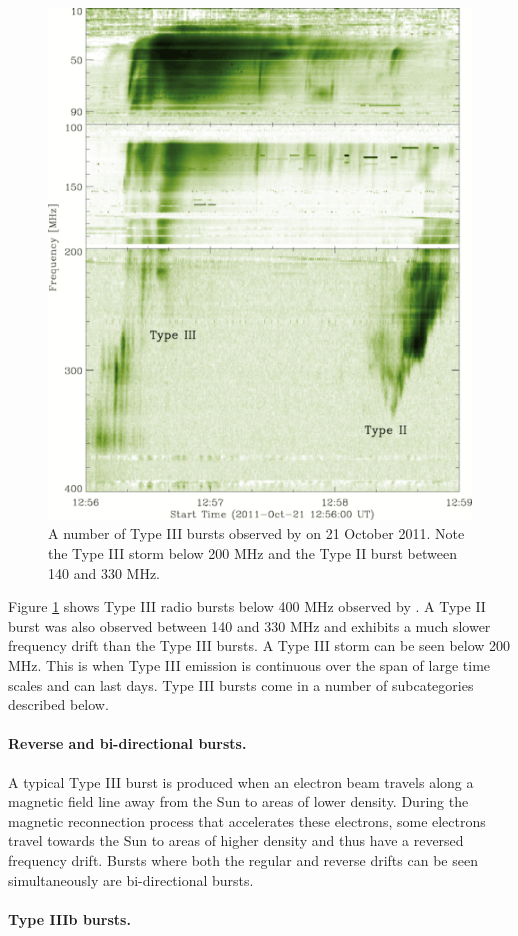 \begin{figure}
    \centering
    \includegraphics[width=0.5\columnwidth]{Images/Pietro_typeIII.png}
    \caption[A number of Type III bursts observed by \cite{Zucca2012} on 21 October 2011.]{A number of Type III bursts observed by \cite{Zucca2012} on 21 October 2011. Note the Type III storm below 200 MHz and the Type II burst between 140 and 330 MHz.}
    \label{fig:bursts}
\end{figure}

Figure \ref{fig:bursts} shows Type III radio bursts below 400 MHz observed by \cite{Zucca2012}. A Type II burst was also observed between 140 and 330 MHz and exhibits a much slower frequency drift than the Type III bursts. A Type III storm can be seen below 200 MHz. This is when Type III emission is continuous over the span of large time scales and can last days. Type III bursts come in a number of subcategories described below.

\paragraph{Reverse and bi-directional bursts.}

A typical Type III burst is produced when an electron beam travels along a magnetic field line away from the Sun to areas of lower density. During the magnetic reconnection process that accelerates these electrons, some electrons travel towards the Sun to areas of higher density and thus have a reversed frequency drift. Bursts where both the regular and reverse drifts can be seen simultaneously are bi-directional bursts.

\paragraph{Type IIIb bursts.}

